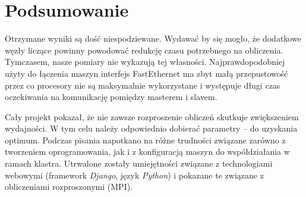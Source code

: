 \documentclass[a4paper]{article}
\begin{document}
\newpage

\section{Podsumowanie}
Otrzymane wyniki są dość niespodziewane. Wydawać by się mogło, że dodatkowe węzły liczące powinny powodować redukcję czasu potrzebnego na obliczenia. Tymczasem, nasze pomiary nie wykazują tej własności. Najprawdopodobniej użyty do łączenia maszyn interfejs FastEthernet ma zbyt małą przepustowość przez co procesory nie są maksymalnie wykorzystane i występuje długi czas oczekiwania na komunikację pomiędzy masterem i slavem.

Cały projekt pokazał, że nie zawsze rozproszenie obliczeń skutkuje zwiększeniem wydajności. W tym celu należy odpowiednio dobierać parametry -- do uzyskania optimum. Podczas pisania napotkano na różne trudności związane zarówno z tworzeniem oprogramowania, jak i z konfiguracją maszyn do współdziałania w ramach klastra. Utrwalone zostały umiejętności związane z technologiami webowymi (framework \textit{Django}, język \textit{Python}) i pokazane te związane z obliczeniami rozproszonymi (MPI).

\newpage
\listoffigures
{}
\end{document}

